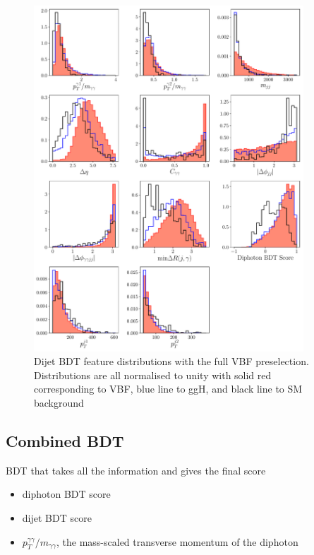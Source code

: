 \begin{figure}[h!]
    \includegraphics[width=0.90\textwidth]{figures/event_selection/dijet_BDT_features_PS.pdf}
    \caption{Dijet BDT feature distributions with the full VBF preselection. Distributions are all normalised to unity with solid red corresponding to VBF, blue line to ggH, and black line to SM background}
    \label{fig:event_categorisaton:dijet_bdt_features}
\end{figure}


\subsection{Combined BDT}
BDT that takes all the information and gives the final score
\begin{itemize}[leftmargin=.5in,noitemsep]
    \item diphoton BDT score
    \item dijet BDT score
    \item $p_{T}^{\gamma\gamma}/m_{\gamma\gamma}$, the mass-scaled transverse momentum of the diphoton
\end{itemize}


